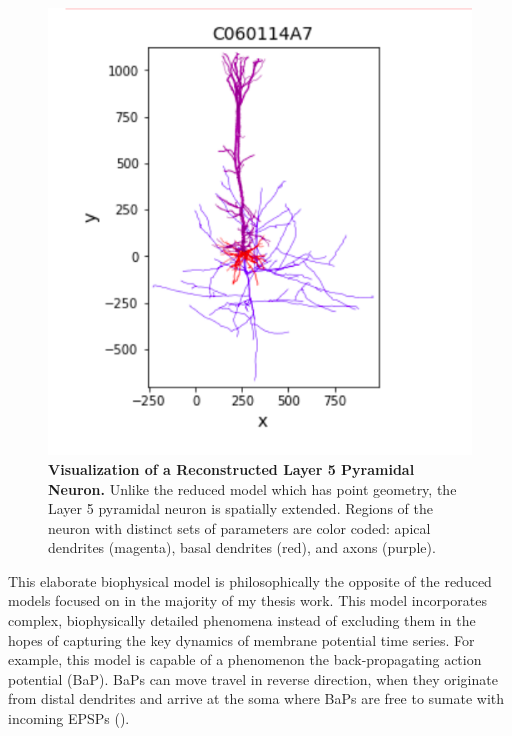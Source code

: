 \begin{figure}%
  \begin{center}
    \includegraphics[scale=0.8]{figures/morphology_view.png}
    \caption[Visualization of a Reconstructed Layer 5 Pyramidal Neuron]{\textbf{Visualization of a Reconstructed Layer 5 Pyramidal Neuron.}
    Unlike the reduced model which has point geometry, the Layer 5 pyramidal neuron is spatially extended.
    Regions of the neuron with distinct sets of parameters are color coded: apical dendrites (magenta), basal dendrites (red), and axons (purple).
    }
  \label{fig:brief_shape}
  \end{center}
\end{figure}

This elaborate biophysical model is philosophically the opposite of the reduced models focused on in the majority of my thesis work. This model incorporates complex, biophysically detailed phenomena instead of excluding them in the hopes of capturing the key dynamics of membrane potential time series.
For example, this model is capable of a phenomenon the back-propagating action potential (BaP). BaPs can move travel in reverse direction, when they originate from distal dendrites and arrive at the soma where BaPs are free to sumate with incoming EPSPs (\cite{spruston2013information}).



